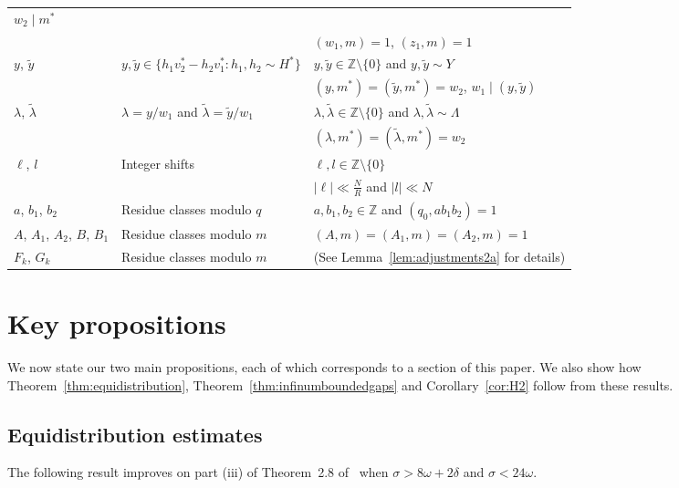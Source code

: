 \documentclass{amsart}
\numberwithin{equation}{section}
\begin{document}
\begin{center}
\begin{tabular}{ | l | l | l |}
       $w_2 \mid m^*$   \\ &  &   $(w_1,m)=1$, $(z_1,m)=1$
        \\ \hline
      $y$, $\widetilde{y}$ & $y, \widetilde{y} \in \{h_1v_2^*-h_2v_1^*: h_1, h_2 \sim H^*\}$ & $y, \widetilde{y} \in \mathbb{Z} \setminus \{0\}$ and $y, \widetilde{y}  \sim Y$ \\ & &
        $(y,m^*) = (\widetilde{y},m^*)=w_2$, $w_1 \mid (y,\widetilde{y})$ \\ \hline 
  $\lambda$, $\widetilde{\lambda}$ & $\lambda = y/w_1$ and $\widetilde{\lambda} = \widetilde{y}/w_1$ &  $\lambda, \widetilde{\lambda} \in \mathbb{Z}\setminus \{0\}$ and $\lambda, \widetilde{\lambda} \sim \Lambda$ \\ & &  $(\lambda,m^*) = (\widetilde{\lambda},m^*)=w_2$
   \\ \hline
 $\ell$, $l$ & Integer shifts & $\ell, l \in \mathbb{Z} \setminus \{0\}$ \\ & & $ |\ell| \ll \frac{N}{R}$ and $|l| \ll N$
 \\
    \hline
        $a$, $b_1$, $b_2$ & Residue classes modulo $q$ & $a,b_1,b_2 \in \mathbb{Z}$ and $(q_0,ab_1b_2)=1$
          \\ \hline
          $A$, $A_1$, $A_2$, $B$, $B_1$ & Residue classes modulo $m$ & $(A,m)=(A_1,m)=(A_2,m)=1$
           \\ \hline
          $F_k$, $G_k$ & Residue classes modulo $m$ & (See Lemma~\ref{lem:adjustments2a} for details)
    \\ \hline
  \end{tabular}
\end{center}


\section{Key propositions} \label{sec:keysteps}



We now state our two main propositions, each of which corresponds to a section of this paper. We also show how Theorem~\ref{thm:equidistribution}, Theorem~\ref{thm:infinumboundedgaps} and Corollary~\ref{cor:H2} follow from these results.  

\subsection{Equidistribution estimates}

The following result improves on part (iii) of Theorem~2.8 of~\cite{Polymath:2014:EDZ} when $\sigma>8\omega+2\delta$ and $\sigma<24 \omega$.
\end{document}
